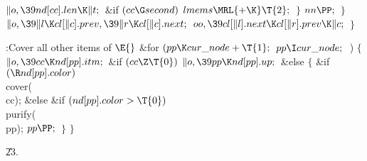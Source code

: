 ${}\|o,\39\\{nd}[\\{cc}].\\{len}\K\|t;{}$\6
\&{if} ${}(\\{cc}\G\\{second}){}$\1\5
${}\\{lmems}\MRL{+{\K}}\T{2};{}$\2\6
\4${}\}{}$\2\6
${}\\{nn}\PP;{}$\6
\4${}\}{}$\2\2\6
${}\|o,\39\|l\K\\{cl}[\|c].\\{prev},\39\|r\K\\{cl}[\|c].\\{next};{}$\6
${}\\{oo},\39\\{cl}[\|l].\\{next}\K\\{cl}[\|r].\\{prev}\K\|c;{}$\6
\4${}\}{}$\2\par
\fi

\B{}:Cover all other items of \X${}\E{}$\6
\&{for} ${}(\\{pp}\K\\{cur\_node}+\T{1};{}$ ${}\\{pp}\I\\{cur\_node};{}$ \,)\5
${}\{{}$\1\6
${}\|o,\39\\{cc}\K\\{nd}[\\{pp}].\\{itm};{}$\6
\&{if} ${}(\\{cc}\Z\T{0}){}$\1\5
${}\|o,\39\\{pp}\K\\{nd}[\\{pp}].\\{up};{}$\2\6
\&{else}\5
${}\{{}$\1\6
\&{if} ${}(\R\\{nd}[\\{pp}].\\{color}){}$\1\5
\\{cover}(\\{cc});\2\6
\&{else} \&{if} ${}(\\{nd}[\\{pp}].\\{color}>\T{0}){}$\1\5
\\{purify}(\\{pp});\2\6
${}\\{pp}\PP;{}$\6
\4${}\}{}$\2\6
\4${}\}{}$\2\par
\U23.\fi

